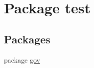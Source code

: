\hypertarget{namespacetest}{\section{Package test}
\label{namespacetest}
}
\subsection*{Packages}
\begin{DoxyCompactItemize}
\item 
package \hyperlink{namespacetest_1_1gov}{gov}
\end{DoxyCompactItemize}
